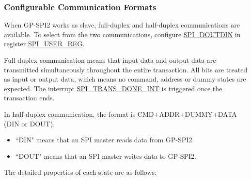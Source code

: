 \documentclass[main\_\_EN.tex]{subfiles}
\begin{document}
\subsubsection{Configurable Communication Formats}\label{slave communication format}

When GP-SPI2 works as slave, full-duplex and half-duplex communications are available. To select from the two communications, configure \hyperref[fielddesc:SPIDOUTDIN]{SPI\_DOUTDIN} in register \hyperref[regdesc:SPIUSERREG]{SPI\_USER\_REG}.

Full-duplex communication means that input data and output data are transmitted simultaneously throughout the entire transaction. All bits are treated as input or output data, which means no command, address or dummy states are expected. The interrupt \hyperref[int:SPITRANSDONEINT]{SPI\_TRANS\_DONE\_INT} is triggered once the transaction ends.

In half-duplex communication, the format is CMD+ADDR+DUMMY+DATA (DIN or DOUT).
\begin{itemize}
    \item``DIN" means that an SPI master reads data from GP-SPI2.
    \item``DOUT" means that an SPI master writes data to GP-SPI2.
\end{itemize}

The detailed properties of each state are as follows:
\end{document}
